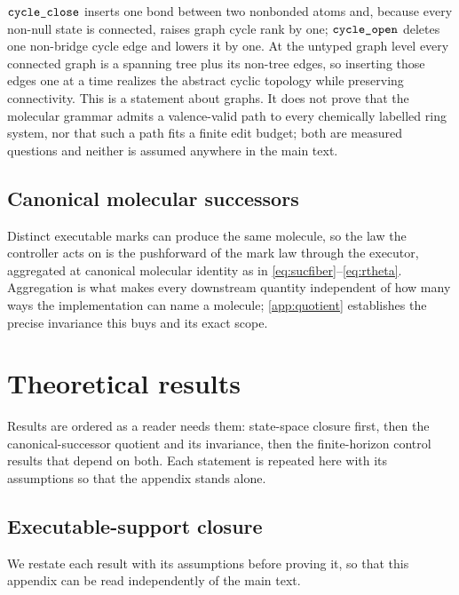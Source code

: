 $\texttt{cycle\_close}$ inserts one bond between two nonbonded atoms and, because every non-null state is connected, raises graph cycle rank by one; $\texttt{cycle\_open}$ deletes one non-bridge cycle edge and lowers it by one.
At the untyped graph level every connected graph is a spanning tree plus its non-tree edges, so inserting those edges one at a time realizes the abstract cyclic topology while preserving connectivity.
This is a statement about graphs.
It does not prove that the molecular grammar admits a valence-valid path to every chemically labelled ring system, nor that such a path fits a finite edit budget; both are measured questions and neither is assumed anywhere in the main text.

\subsection{Canonical molecular successors}

Distinct executable marks can produce the same molecule, so the law the controller acts on is the pushforward of the mark law through the executor, aggregated at canonical molecular identity as in \eqref{eq:sucfiber}--\eqref{eq:rtheta}. Aggregation is what makes every downstream quantity independent of how many ways the implementation can name a molecule; \cref{app:quotient} establishes the precise invariance this buys and its exact scope.

\section{Theoretical results}
\label{app:theory}

Results are ordered as a reader needs them: state-space closure first, then the canonical-successor quotient and its invariance, then the finite-horizon control results that depend on both. Each statement is repeated here with its assumptions so that the appendix stands alone.

\subsection{Executable-support closure}
\label{app:proofs}

We restate each result with its assumptions before proving it, so that this appendix can be read independently of the main text.

